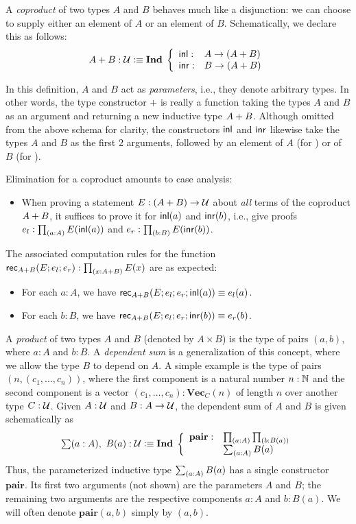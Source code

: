 A \emph{coproduct} of two types $A$ and $B$ behaves much like a disjunction: we can choose to supply either an element of $A$ or an element of $B$.
Schematically, we declare this as follows:
\[ A + B : \mathcal{U} \vcentcolon\equiv \mathbf{Ind \;} \left\{
\begin{array}{ll}
\mathsf{inl} : & A \to (A + B) \\
\mathsf{inr} : & B \to (A + B)
\end{array}
\right. \]

In this definition, $A$ and $B$ act as \emph{parameters}, i.e., they denote arbitrary types. In other words, the type constructor $+$ is really a function taking the types $A$ and $B$ as an argument and returning a new inductive type $A + B$. Although omitted from the above schema for clarity, the constructors $\mathsf{inl}$ and $\mathsf{inr}$ likewise take the types $A$ and $B$ as the first 2 arguments, followed by an element of $A$ (for \inl) or of $B$ (for \inr).

Elimination for a coproduct amounts to case analysis:
\begin{itemize}
\item When proving a statement $E : (A + B) \to \mathcal{U}$ about \emph{all} terms of the coproduct $A + B$, it suffices to prove it for $\mathsf{inl}(a)$ and $\mathsf{inr}(b)$, i.e., give proofs $e_l : \prd{a:A} E(\inl(a))$ and $e_r : \prd{b:B} E(\inr(b))$.
\end{itemize}
The associated computation rules for the function $\rec{\disj{A}{B}}(E;e_l;e_r) : \prd{x:\disj{A}{B}} E(x)$ are as expected:
\begin{itemize}
\item For each $a : A$, we have $\mathsf{rec}_{A + B}(E;e_l;e_r;\mathsf{inl}(a)) \equiv e_l(a)$.
\item For each $b : B$, we have $\mathsf{rec}_{A + B}(E;e_l;e_r;\mathsf{inr}(b)) \equiv e_r(b)$.
\end{itemize}

A \emph{product} of two types $A$ and $B$ (denoted by $A \times B$) is the type of pairs $(a,b)$, where $a : A$ and $b : B$. A \emph{dependent sum} is a generalization of this concept, where we allow the type $B$ to depend on $A$. A simple example is the type of pairs $(n,(c_1,\ldots,c_n))$, where the first component is a natural number $n : \mathbb{N}$ and the second component is a vector $(c_1,\ldots,c_n) : \mathbf{Vec}_C(n)$ of length $n$ over another type $C : \mathcal{U}$.
Given $A : \mathcal{U}$ and $B : A \to \mathcal{U}$, the dependent sum of $A$ and $B$ is given schematically as
\[ \sm{a:A} B(a) : \type \defeq \myInd \left\{
\begin{array}{ll}
\mathbf{pair} : & \prd{a:A}{b:B(a)} \\
& \sm{a:A} B(a)
\end{array}
\right. \]
Thus, the parameterized inductive type $\sm{a:A} B(a)$ has a single constructor $\mathbf{pair}$. Its first two arguments (not shown) are the parameters $A$ and $B$; the remaining two arguments are the respective components $a : A$ and $b : B(a)$. We will often denote $\mathbf{pair}(a,b)$ simply by $(a,b)$.

